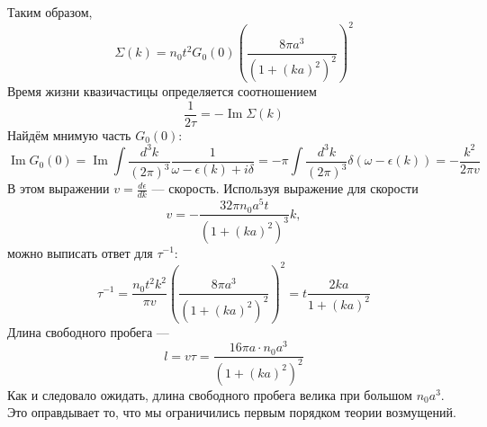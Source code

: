 \documentclass{article}
\begin{document}
    Таким образом,
    \begin{equation}
        \Sigma(k) = n_0t^2G_0(0) 
                \left(\frac{8\pi a^3 }{(1 + (ka)^2)^2}\right)^2
    \end{equation}
    Время жизни квазичастицы определяется соотношением
    \begin{equation}
        \frac{1}{2\tau} = -\operatorname{Im} \Sigma(k)
    \end{equation}
    Найдём мнимую часть $G_0(0)$:
    \begin{equation}
        \operatorname{Im} G_0(0) = \operatorname{Im} \int \frac{d^3 k}{(2\pi)^3}
                        \frac{1}{\omega - \epsilon(k) + i\delta} = 
                        -\pi \int \frac{d^3 k}{(2\pi)^3} \delta(\omega - \epsilon(k)) = 
                        -\frac{k^2}{2\pi v}
    \end{equation}
    В этом выражении $v = \frac{d\epsilon}{dk}$ --- скорость. Используя выражение для 
    скорости
    \begin{equation}
        v = -\frac{32\pi n_0 a^5 t}{(1 + (ka)^2)^3} k,
    \end{equation} 
    можно выписать ответ для $\tau^{-1}$:
    \begin{equation}
        \tau^{-1} = \frac{n_0 t^2 k^2}{\pi v} \left(\frac{8\pi a^3 }{(1 + (ka)^2)^2}\right)^2 =
         t \frac{2ka}{1 + (ka)^2}
    \end{equation}
    Длина свободного пробега --- 
    \begin{equation}
        l = v\tau = \frac{16\pi a \cdot n_0 a^3}{(1 + (ka)^2)^2}
    \end{equation}
    Как и следовало ожидать, длина свободного пробега  велика при большом $n_0 a^3$. Это 
    оправдывает то, что мы ограничились первым порядком теории возмущений.
\end{document}
